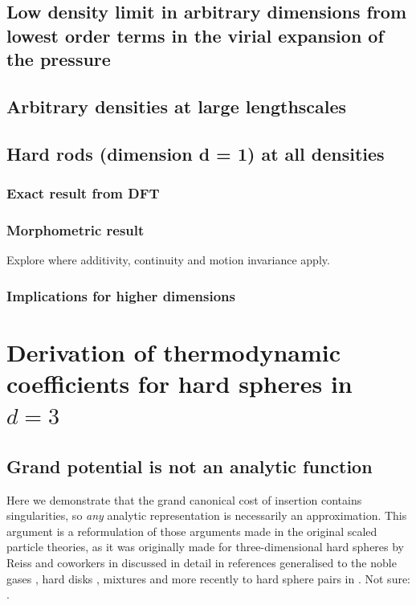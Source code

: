 \documentclass[12pt]{report}
\begin{document}
\subsection{Low density limit in arbitrary dimensions from lowest order terms in the virial expansion of the pressure}
\subsection{Arbitrary densities at large lengthscales}
\subsection{Hard rods (dimension d = 1) at all densities}
\subsubsection{Exact result from DFT}
\subsubsection{Morphometric result}
Explore where additivity, continuity and motion invariance apply.
\subsubsection{Implications for higher dimensions}

\section{Derivation of thermodynamic coefficients for hard spheres in $d = 3$}

\subsection{Grand potential is not an analytic function}

Here we demonstrate that the grand canonical cost of insertion contains singularities, so \emph{any} analytic representation is necessarily an approximation.
This argument is a reformulation of those arguments made in the original scaled particle theories, as it was originally made for three-dimensional hard spheres by Reiss and coworkers in \cite{Reiss1959,Reiss1960,Mandell1976} discussed in detail in references 
generalised to the noble gases \cite{Helfand1960}, hard disks \cite{Helfand1961}, mixtures \cite{Lebowitz1965} and more recently to hard sphere pairs in \cite{Stillinger2006,Chatterjee2006}.
Not sure: \cite{Reiss1961,Frisch1964,Reiss1965,Reiss1974,Tully-Smith1970,Harris1971}.
\end{document}
